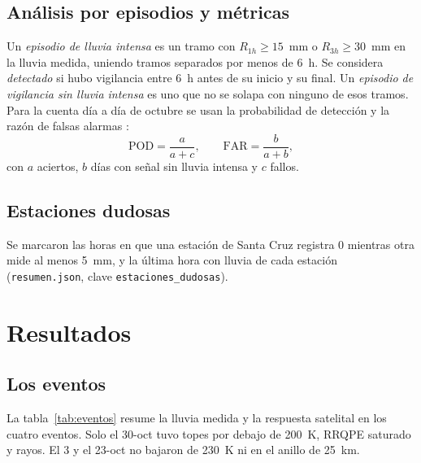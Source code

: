 \documentclass{sosg-informe}
\begin{document}
\subsection{Análisis por episodios y métricas}
Un \emph{episodio de lluvia intensa} es un tramo con $R_{1h} \geq 15$~mm o $R_{3h} \geq 30$~mm en la lluvia medida, uniendo tramos separados por menos de 6~h. Se considera \emph{detectado} si hubo vigilancia entre 6~h antes de su inicio y su final. Un \emph{episodio de vigilancia sin lluvia intensa} es uno que no se solapa con ninguno de esos tramos. Para la cuenta día a día de octubre se usan la probabilidad de detección y la razón de falsas alarmas \citep{wilks2011}:
\begin{equation}
  \mathrm{POD} = \frac{a}{a+c}, \qquad \mathrm{FAR} = \frac{b}{a+b},
  \label{eq:pod}
\end{equation}
con $a$ aciertos, $b$ días con señal sin lluvia intensa y $c$ fallos.

\subsection{Estaciones dudosas}
Se marcaron las horas en que una estación de Santa Cruz registra 0 mientras otra mide al menos 5~mm, y la última hora con lluvia de cada estación (\texttt{resumen.json}, clave \texttt{estaciones\_dudosas}).

\section{Resultados}

\subsection{Los eventos}
La tabla~\ref{tab:eventos} resume la lluvia medida y la respuesta satelital en los cuatro eventos. Solo el 30-oct tuvo topes por debajo de 200~K, RRQPE saturado y rayos. El 3 y el 23-oct no bajaron de 230~K ni en el anillo de 25~km.
\end{document}
